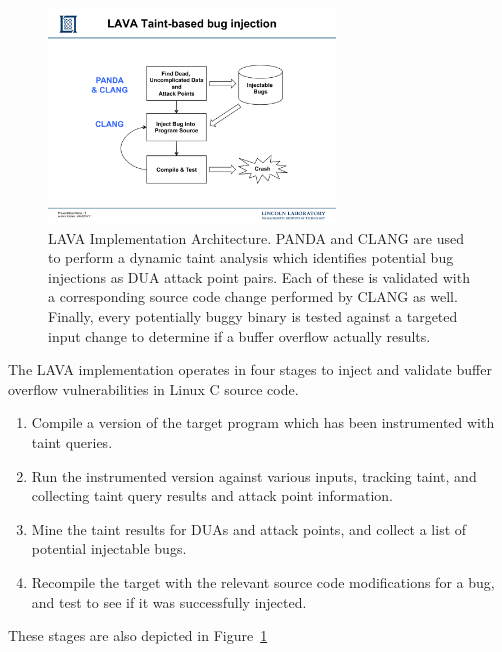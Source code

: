 
\begin{figure}
\centering
\includegraphics[width=3in]{lava-arch.pdf}
\caption{LAVA Implementation Architecture.  PANDA and CLANG are used to perform a dynamic taint analysis which identifies potential bug injections as DUA attack point pairs.
Each of these is validated with a corresponding source code change performed by CLANG as well.
Finally, every potentially buggy binary is tested against a targeted input change to determine if a buffer overflow actually results.}
\label{fig:lava-impl}
\end{figure}


The LAVA implementation operates in four stages to inject and validate buffer overflow vulnerabilities in Linux C source code. 

\begin{enumerate}
\item Compile a version of the target program which has been instrumented with taint queries.
\item Run the instrumented version against various inputs, tracking taint, and collecting taint query results and attack point information.
\item Mine the taint results for DUAs and attack points, and collect a list of potential injectable bugs.
\item Recompile the target with the relevant source code modifications for a bug, and test to see if it was successfully injected.
\end{enumerate}

These stages are also depicted in Figure~\ref{fig:lava-impl}

